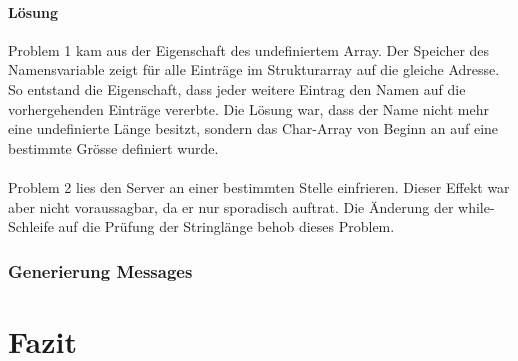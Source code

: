 \documentclass[12pt,a4paper,ngerman]{report}
\begin{document}
\subsubsection{Lösung}
Problem 1 kam aus der Eigenschaft des undefiniertem Array. Der Speicher des Namensvariable zeigt für alle Einträge im Strukturarray auf die gleiche Adresse. So entstand die Eigenschaft, dass jeder weitere Eintrag den Namen auf die vorhergehenden Einträge vererbte. Die Lösung war, dass der Name nicht mehr eine undefinierte Länge besitzt, sondern das Char-Array von Beginn an auf eine bestimmte Grösse definiert wurde.\\
\\
Problem 2 lies den Server an einer bestimmten Stelle einfrieren. Dieser Effekt war aber nicht voraussagbar, da er nur sporadisch auftrat. Die Änderung der while-Schleife auf die Prüfung der Stringlänge behob dieses Problem. 
\subsection{Generierung Messages}

\chapter{Fazit}
\end{document}
